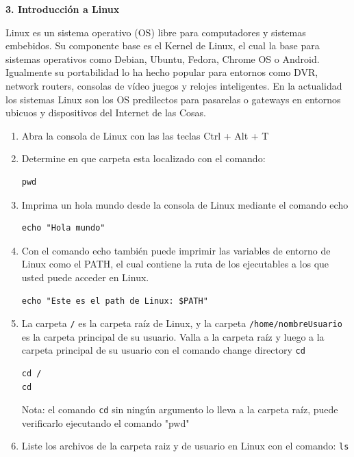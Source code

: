 \documentclass[10pt,letterpaper]{article}
\begin{document}
\begin{center}
\textbf{3. Introducción a Linux}
\end{center}

Linux es un sistema operativo (OS) libre para computadores y sistemas embebidos. Su componente base es el Kernel de Linux, el cual la base para sistemas operativos como Debian, Ubuntu, Fedora, Chrome OS o Android. Igualmente su portabilidad lo ha hecho popular para entornos como DVR, network routers, consolas de vídeo juegos y relojes inteligentes. En la actualidad los sistemas Linux son los OS predilectos para  pasarelas o gateways en entornos ubicuos y dispositivos del Internet de las Cosas. 

\begin{enumerate}

\item Abra la consola de Linux con las las teclas Ctrl + Alt + T

\item Determine en que carpeta esta localizado con el comando: 
\begin{verbatim}
pwd
\end{verbatim}

\item Imprima un hola mundo desde la consola de Linux mediante el comando echo
\begin{verbatim}
echo "Hola mundo"
\end{verbatim}

\item Con el comando echo también puede imprimir las variables de entorno de Linux como el PATH, el cual contiene la ruta de los ejecutables a los que usted puede acceder en Linux. 
\begin{verbatim}
echo "Este es el path de Linux: $PATH"
\end{verbatim}

\item La carpeta \verb|/| es la carpeta raíz de Linux, y la carpeta \verb|/home/nombreUsuario| es la carpeta principal de su usuario. Valla a la carpeta raíz y luego a la carpeta principal de su usuario con el comando change directory \verb|cd|
\begin{verbatim}
cd /
cd 
\end{verbatim}

Nota: el comando \verb|cd| sin ningún argumento lo lleva a la carpeta raíz, puede verificarlo ejecutando el comando "pwd"


\item Liste los archivos de la carpeta raiz y de usuario en Linux con el comando: \verb|ls|


\end{enumerate}
\end{document}
